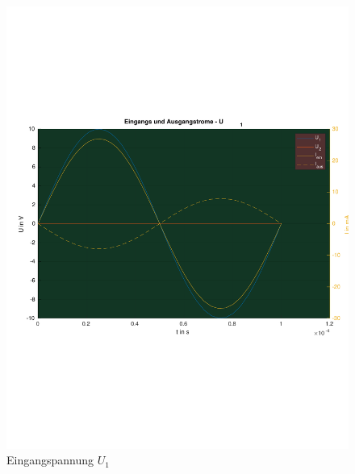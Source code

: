 \begin{figure}[H]
    \centering
    \includegraphics[clip,trim=20pt 200pt 0 200pt,scale=.8]{src/einausgangU_1.pdf}
    \caption{Eingangspannung $U_1$}
    \label{fig:Simulationplot}
\end{figure}
